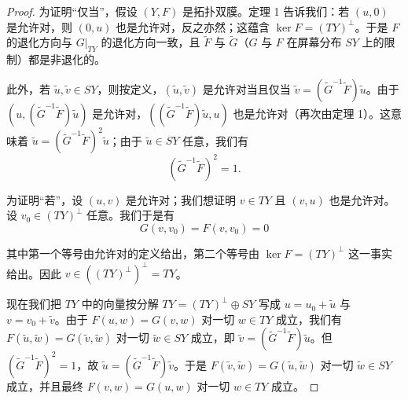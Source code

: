 \begin{proof}
为证明“仅当”，假设 $(Y,F)$ 是拓扑双膜。定理 1 告诉我们：若 $(u,0)$ 是允许对，则 $(0,u)$ 也是允许对，反之亦然；这蕴含 $\ker F=(TY)^\perp$。于是 $F$ 的退化方向与 $G|_{TY}$ 的退化方向一致，且 $\widetilde F$ 与 $\widetilde G$（$G$ 与 $F$ 在屏幕分布 $SY$ 上的限制）都是非退化的。

此外，若 $\tilde u,\tilde v\in SY$，则按定义，$(\tilde u,\tilde v)$ 是允许对当且仅当 $\tilde v=(\widetilde G^{-1}\widetilde F)\tilde u$。由于 $(u,(\widetilde G^{-1}\widetilde F)\tilde u)$ 是允许对，$((\widetilde G^{-1}\widetilde F)\tilde u,u)$ 也是允许对（再次由定理 1）。这意味着 $\tilde u=(\widetilde G^{-1}\widetilde F)^2\tilde u$；由于 $\tilde u\in SY$ 任意，我们有
\[
  (\widetilde G^{-1}\widetilde F)^2=1 .
\]


为证明“若”，设 $(u,v)$ 是允许对；我们想证明 $v\in TY$ 且 $(v,u)$ 也是允许对。设 $v_0\in(TY)^\perp$ 任意。我们于是有
\[
  G(v,v_0)=F(v,v_0)=0
\]

其中第一个等号由允许对的定义给出，第二个等号由 $\ker F=(TY)^\perp$ 这一事实给出。因此 $v\in((TY)^\perp)^\perp=TY$。


现在我们把 $TY$ 中的向量按分解 $TY=(TY)^\perp\oplus SY$ 写成 $u=u_0+\tilde u$ 与 $v=v_0+\tilde v$。由于 $F(u,w)=G(v,w)$ 对一切 $w\in TY$ 成立，我们有 $F(\tilde u,\tilde w)=G(\tilde v,\tilde w)$ 对一切 $\tilde w\in SY$ 成立，即 $\tilde v=(\widetilde G^{-1}\widetilde F)\tilde u$。但 $(\widetilde G^{-1}\widetilde F)^2=1$，故 $\tilde u=(\widetilde G^{-1}\widetilde F)\tilde v$。于是 $F(\tilde v,\tilde w)=G(\tilde u,\tilde w)$ 对一切 $\tilde w\in SY$ 成立，并且最终 $F(v,w)=G(u,w)$ 对一切 $w\in TY$ 成立。\end{proof}

